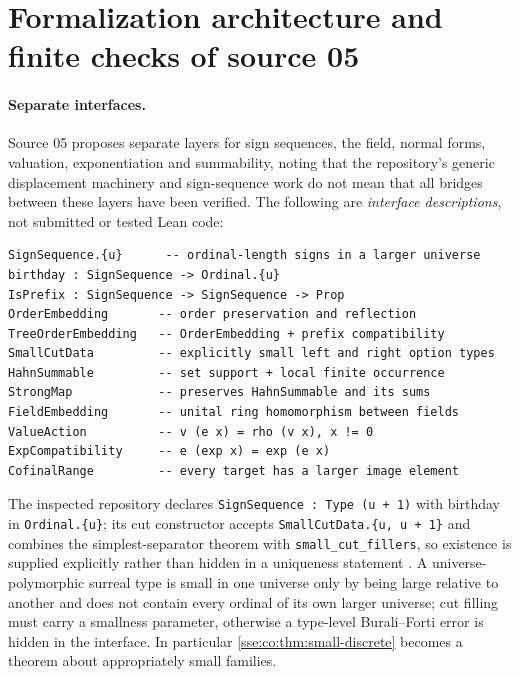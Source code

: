 \documentclass[11pt,a4paper]{article}
\numberwithin{equation}{section}
\theoremstyle{plain}
\theoremstyle{definition}
\theoremstyle{remark}
\newcommand{\code}[1]{\texttt{\small #1}}
\begin{document}
\section{Formalization architecture and finite checks of source 05}\label{sse:co:sec:formal}

\paragraph{Separate interfaces.} Source 05 proposes separate layers for sign
sequences, the field, normal forms, valuation, exponentiation and
summability, noting that the repository's generic displacement machinery and
sign-sequence work do not mean that all bridges between these layers have
been verified. The following are \emph{interface descriptions}, not
submitted or tested Lean code:
\begin{verbatim}
SignSequence.{u}      -- ordinal-length signs in a larger universe
birthday : SignSequence -> Ordinal.{u}
IsPrefix : SignSequence -> SignSequence -> Prop
OrderEmbedding       -- order preservation and reflection
TreeOrderEmbedding   -- OrderEmbedding + prefix compatibility
SmallCutData         -- explicitly small left and right option types
HahnSummable         -- set support + local finite occurrence
StrongMap            -- preserves HahnSummable and its sums
FieldEmbedding       -- unital ring homomorphism between fields
ValueAction          -- v (e x) = rho (v x), x != 0
ExpCompatibility     -- e (exp x) = exp (e x)
CofinalRange         -- every target has a larger image element
\end{verbatim}
The inspected repository declares \code{SignSequence : Type (u + 1)} with
birthday in \code{Ordinal.\{u\}}; its cut constructor accepts
\code{SmallCutData.\{u, u + 1\}} and combines the simplest-separator theorem
with \code{small\_cut\_fillers}, so existence is supplied explicitly rather
than hidden in a uniqueness statement \cite{RepoSigns,co-RepoCut}. A
universe-polymorphic surreal type is small in one universe only by being
large relative to another and does not contain every ordinal of its own
larger universe; cut filling must carry a smallness parameter, otherwise a
type-level Burali--Forti error is hidden in the interface. In particular
\cref{sse:co:thm:small-discrete} becomes a theorem about appropriately small
families.
\end{document}
